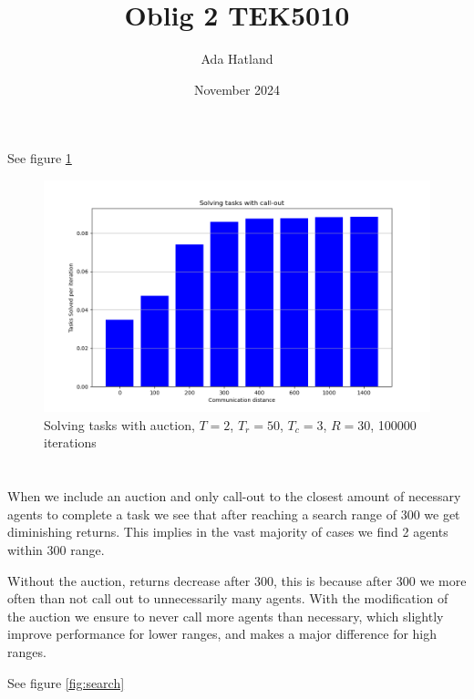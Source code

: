 \documentclass{article}
\title{Oblig 2 TEK5010}
\author{Ada Hatland}
\date{November 2024}
\begin{document}
\maketitle

\section{}
See figure \ref{fig:auction}

\begin{figure}
	\includegraphics[width=\textwidth]{auction.png}
	\caption{Solving tasks with auction, $T=2$, $T_r=50$, $T_c=3$, $R=30$, 100000 iterations}
	\label{fig:auction}
\end{figure}


\section{}
When we include an auction and only call-out to the closest amount of necessary agents to complete a task we see that after reaching a search range of 300 we get diminishing returns. This implies in the vast majority of cases we find 2 agents within 300 range.

Without the auction, returns decrease after 300, this is because after 300 we more often than not call out to unnecessarily many agents. With the modification of the auction we ensure to never call more agents than necessary, which slightly improve performance for lower ranges, and makes a major difference for high ranges.

See figure \ref{fig:search}
\end{document}
